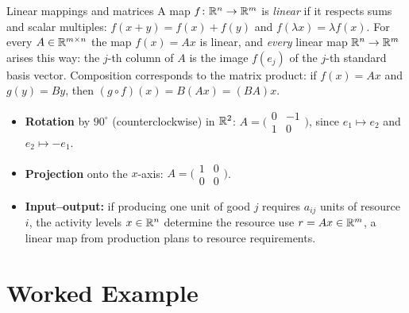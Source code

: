 \begin{rulebox}{Linear mappings and matrices}
A map $f \colon \mathbb{R}^{n} \to \mathbb{R}^{m}$ is \emph{linear} if it respects sums and scalar multiples:
$f(x + y) = f(x) + f(y)$ and $f(\lambda x) = \lambda f(x)$. For every
$A \in \mathbb{R}^{m \times n}$ the map $f(x) = A x$ is linear, and \emph{every}
linear map $\mathbb{R}^{n} \to \mathbb{R}^{m}$ arises this way: the $j$-th column of $A$
is the image $f(e_{j})$ of the $j$-th standard basis vector. Composition
corresponds to the matrix product: if $f(x) = A x$ and $g(y) = B y$, then
$(g \circ f)(x) = B(A x) = (B A) x$.
\begin{itemize}[leftmargin=1.6em,itemsep=0.3ex]
    \item \textbf{Rotation} by $90^{\circ}$ (counterclockwise) in
          $\mathbb{R}^{2}$: $A = \bigl(\begin{smallmatrix} 0 & -1 \\ 1 & 0 \end{smallmatrix}\bigr)$,
          since $e_{1} \mapsto e_{2}$ and $e_{2} \mapsto -e_{1}$.
    \item \textbf{Projection} onto the $x$-axis:
          $A = \bigl(\begin{smallmatrix} 1 & 0 \\ 0 & 0 \end{smallmatrix}\bigr)$.
    \item \textbf{Input--output:} if producing one unit of good $j$
          requires $a_{ij}$ units of resource $i$, the activity levels
          $x \in \mathbb{R}^{n}$ determine the resource use $r = A x \in \mathbb{R}^{m}$,
          a linear map from production plans to resource requirements.
\end{itemize}
\end{rulebox}

\section{Worked Example}

